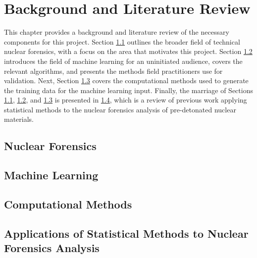\chapter{Background and Literature Review}
\label{ch:litrev}

This chapter provides a background and literature review of the necessary
components for this project. Section \ref{sec:nfoverview} outlines the broader
field of technical nuclear forensics, with a focus on the area that motivates
this project.  Section \ref{sec:mlback} introduces the field of machine
learning for an uninitiated audience, covers the relevant algorithms, and
presents the methods field practitioners use for validation. Next, Section
\ref{sec:fcsim} covers the computational methods used to generate the training
data for the machine learning input. Finally, the marriage of Sections
\ref{sec:nfoverview}, \ref{sec:mlback}, and \ref{sec:fcsim} is presented in
\ref{sec:stats4nf}, which is a review of previous work applying statistical
methods to the nuclear forensics analysis of pre-detonated nuclear materials. 

\section{Nuclear Forensics}
\label{sec:nfoverview}


\section{Machine Learning}
\label{sec:mlback}


\section{Computational Methods}
\label{sec:fcsim}


\section{Applications of Statistical Methods to Nuclear Forensics Analysis}
\label{sec:stats4nf}


